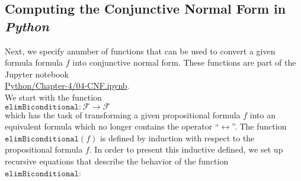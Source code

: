 \subsection{Computing the Conjunctive Normal Form in \textsl{Python}}
Next, we specify anumber of functions that can be used to convert a given formula
formula $f$ into conjunctive normal form.  These functions are part of the Jupyter notebook
\\[0.2cm]
\hspace*{1.3cm}
\href{https://github.com/karlstroetmann/Logic/blob/master/Python/Chapter-4/04-CNF.ipynb}{Python/Chapter-4/04-CNF.ipynb}.
\\[0.2cm]
We start with the
function 
\\[0.2cm]
\hspace*{1.3cm}
$\texttt{elimBiconditional}: \mathcal{F} \rightarrow \mathcal{F}$
\\[0.2cm]
which has the task of transforming a given propositional formula $f$ into an equivalent formula
which no longer contains the operator ``$\leftrightarrow$''.  The function
$\texttt{elimBiconditional}(f)$ is defined by induction with respect to the propositional formula $f$.
In order to present this inductive defined, we set up recursive equations
that describe the behavior of the function $\texttt{elimBiconditional}$:
